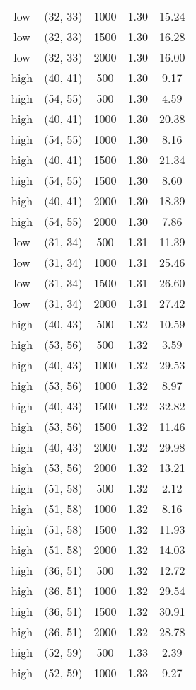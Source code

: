 \begin{tabular}{c c c c c}
low & (32, 33) &  1000 & 1.30 & 15.24 \\
low & (32, 33) &  1500 & 1.30 & 16.28 \\
low & (32, 33) &  2000 & 1.30 & 16.00 \\
high & (40, 41) &  500 & 1.30 & 9.17 \\
high & (54, 55) &  500 & 1.30 & 4.59 \\
high & (40, 41) &  1000 & 1.30 & 20.38 \\
high & (54, 55) &  1000 & 1.30 & 8.16 \\
high & (40, 41) &  1500 & 1.30 & 21.34 \\
high & (54, 55) &  1500 & 1.30 & 8.60 \\
high & (40, 41) &  2000 & 1.30 & 18.39 \\
high & (54, 55) &  2000 & 1.30 & 7.86 \\
low & (31, 34) &  500 & 1.31 & 11.39 \\
low & (31, 34) &  1000 & 1.31 & 25.46 \\
low & (31, 34) &  1500 & 1.31 & 26.60 \\
low & (31, 34) &  2000 & 1.31 & 27.42 \\
high & (40, 43) &  500 & 1.32 & 10.59 \\
high & (53, 56) &  500 & 1.32 & 3.59 \\
high & (40, 43) &  1000 & 1.32 & 29.53 \\
high & (53, 56) &  1000 & 1.32 & 8.97 \\
high & (40, 43) &  1500 & 1.32 & 32.82 \\
high & (53, 56) &  1500 & 1.32 & 11.46 \\
high & (40, 43) &  2000 & 1.32 & 29.98 \\
high & (53, 56) &  2000 & 1.32 & 13.21 \\
high & (51, 58) &  500 & 1.32 & 2.12 \\
high & (51, 58) &  1000 & 1.32 & 8.16 \\
high & (51, 58) &  1500 & 1.32 & 11.93 \\
high & (51, 58) &  2000 & 1.32 & 14.03 \\
high & (36, 51) &  500 & 1.32 & 12.72 \\
high & (36, 51) &  1000 & 1.32 & 29.54 \\
high & (36, 51) &  1500 & 1.32 & 30.91 \\
high & (36, 51) &  2000 & 1.32 & 28.78 \\
high & (52, 59) &  500 & 1.33 & 2.39 \\
high & (52, 59) &  1000 & 1.33 & 9.27 \\

\end{tabular}
